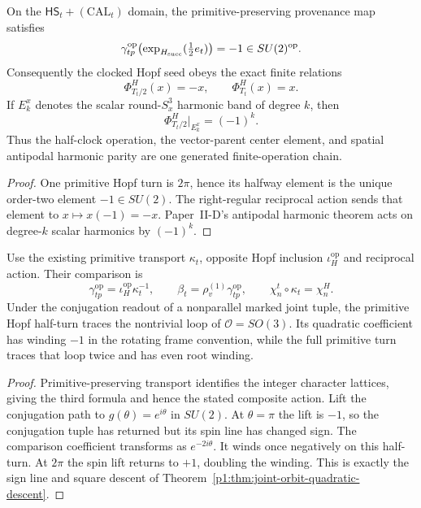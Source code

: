 \documentclass[12pt,a4paper]{article}
\begin{document}
\begin{corollary}
\label{p3a:cor:clock-half-turn-antipode}
On the \(\mathsf{HS}_t+(\mathrm{CAL}_t)\) domain, the primitive-preserving
provenance map satisfies
\[
 \gamma_{tp}^{\rm op}\!\left(\exp_{H_{\rm succ}}(\tfrac12 e_t)\right)=-1
 \in SU(2)^{\rm op}.
\]
Consequently the clocked Hopf seed obeys the exact finite relations
\[
 \boxed{\Phi^H_{T_t/2}(x)=-x,\qquad \Phi^H_{T_t}(x)=x.}
\]
If \(E_k^x\) denotes the scalar round-\(S^3_x\) harmonic band of degree
\(k\), then
\[
 \boxed{\Phi^H_{T_t/2}|_{E_k^x}=(-1)^k.}
\]
Thus the half-clock operation, the vector-parent center element, and spatial
antipodal harmonic parity are one generated finite-operation chain.
\end{corollary}

\begin{proof}
One primitive Hopf turn is \(2\pi\), hence its halfway element is the unique
order-two element \(-1\in SU(2)\).  The right-regular reciprocal action sends
that element to \(x\mapsto x(-1)=-x\).  Paper~II-D's antipodal harmonic
theorem acts on degree-\(k\) scalar harmonics by \((-1)^k\).
\end{proof}

\begin{corollary}
\label{p3a:cor:clock-joint-orbit-monodromy}
Use the existing primitive transport \(\kappa_t\), opposite Hopf
inclusion \(\iota_H^{\mathrm{op}}\) and reciprocal action.  Their
comparison is
\[
 \gamma_{tp}^{\mathrm{op}}=\iota_H^{\mathrm{op}}\kappa_t^{-1},
 \qquad \beta_t=\rho_v^{(1)}\gamma_{tp}^{\mathrm{op}},
 \qquad \chi_n^t\circ\kappa_t=\chi_n^H.
\]
Under the conjugation readout of a nonparallel marked joint tuple,
the primitive Hopf half-turn traces the nontrivial loop of
\(\mathcal O=SO(3)\).  Its quadratic coefficient has winding \(-1\)
in the rotating frame convention, while the full primitive turn
traces that loop twice and has even root winding.
\end{corollary}
\begin{proof}
Primitive-preserving transport identifies the integer character
lattices, giving the third formula and hence the stated composite
action.  Lift the conjugation path to \(g(\theta)=e^{i\theta}\)
in \(SU(2)\).  At \(\theta=\pi\) the lift is \(-1\), so the
conjugation tuple has returned but its spin line has changed sign.
The comparison coefficient transforms as \(e^{-2i\theta}\).
It winds once negatively on this half-turn.  At \(2\pi\) the spin
lift returns to \(+1\), doubling the winding.  This is exactly the
sign line and square descent of
Theorem~\ref{p1:thm:joint-orbit-quadratic-descent}.
\end{proof}
\end{document}
